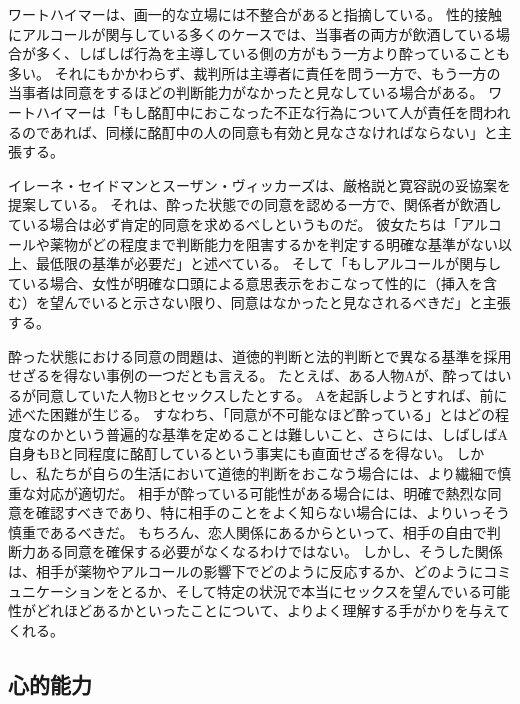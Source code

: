 \documentclass[paper=a4,book,openany]{jlreq}
\begin{document}
ワートハイマーは、画一的な立場には不整合があると指摘している。
性的接触にアルコールが関与している多くのケースでは、当事者の両方が飲酒している場合が多く、しばしば行為を主導している側の方がもう一方より酔っていることも多い。
それにもかかわらず、裁判所は主導者に責任を問う一方で、もう一方の当事者は同意をするほどの判断能力がなかったと見なしている場合がある。
ワートハイマーは「もし酩酊中におこなった不正な行為について人が責任を問われるのであれば、同様に酩酊中の人の同意も有効と見なさなければならない」と主張する\citep[p.233]{wertheimer03:_consen_sexual_relat}。

イレーネ・セイドマンとスーザン・ヴィッカーズは、厳格説と寛容説の妥協案を提案している。
それは、酔った状態での同意を認める一方で、関係者が飲酒している場合は必ず肯定的同意を求めるべしというものだ。
彼女たちは「アルコールや薬物がどの程度まで判断能力を阻害するかを判定する明確な基準がない以上、最低限の基準が必要だ」と述べている。
そして「もしアルコールが関与している場合、女性が明確な口頭による意思表示をおこなって性的に（挿入を含む）を望んでいると示さない限り、同意はなかったと見なされるべきだ」と主張する\citep[p.486]{seidman05:_secon_wave}。

酔った状態における同意の問題は、道徳的判断と法的判断とで異なる基準を採用せざるを得ない事例の一つだとも言える。
たとえば、ある人物Aが、酔ってはいるが同意していた人物Bとセックスしたとする。
Aを起訴しようとすれば、前に述べた困難が生じる。
すなわち、「同意が不可能なほど酔っている」とはどの程度なのかという普遍的な基準を定めることは難しいこと、さらには、しばしばA自身もBと同程度に酩酊しているという事実にも直面せざるを得ない。
しかし、私たちが自らの生活において道徳的判断をおこなう場合には、より繊細で慎重な対応が適切だ。
相手が酔っている可能性がある場合には、明確で熱烈な同意を確認すべきであり、特に相手のことをよく知らない場合には、よりいっそう慎重であるべきだ。
もちろん、恋人関係にあるからといって、相手の自由で判断力ある同意を確保する必要がなくなるわけではない。
しかし、そうした関係は、相手が薬物やアルコールの影響下でどのように反応するか、どのようにコミュニケーションをとるか、そして特定の状況で本当にセックスを望んでいる可能性がどれほどあるかといったことについて、よりよく理解する手がかりを与えてくれる。

\subsection{心的能力}
\end{document}
